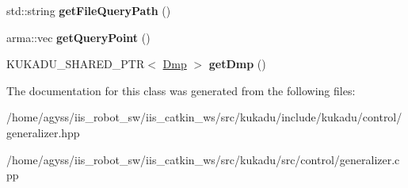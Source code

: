 \begin{DoxyCompactItemize}
\item 
std\+::string {\bfseries get\+File\+Query\+Path} ()\hypertarget{classkukadu_1_1QueryPoint_a89324d5514596508eb423e47fc7c5eb4}{}\label{classkukadu_1_1QueryPoint_a89324d5514596508eb423e47fc7c5eb4}

\item 
arma\+::vec {\bfseries get\+Query\+Point} ()\hypertarget{classkukadu_1_1QueryPoint_a532d7a36ed8e43f9a5cec52f05a0170a}{}\label{classkukadu_1_1QueryPoint_a532d7a36ed8e43f9a5cec52f05a0170a}

\item 
K\+U\+K\+A\+D\+U\+\_\+\+S\+H\+A\+R\+E\+D\+\_\+\+P\+TR$<$ \hyperlink{classkukadu_1_1Dmp}{Dmp} $>$ {\bfseries get\+Dmp} ()\hypertarget{classkukadu_1_1QueryPoint_a153252510a2083463caf5ce2cbcfeb5f}{}\label{classkukadu_1_1QueryPoint_a153252510a2083463caf5ce2cbcfeb5f}

\end{DoxyCompactItemize}


The documentation for this class was generated from the following files\+:\begin{DoxyCompactItemize}
\item 
/home/agyss/iis\+\_\+robot\+\_\+sw/iis\+\_\+catkin\+\_\+ws/src/kukadu/include/kukadu/control/generalizer.\+hpp\item 
/home/agyss/iis\+\_\+robot\+\_\+sw/iis\+\_\+catkin\+\_\+ws/src/kukadu/src/control/generalizer.\+cpp\end{DoxyCompactItemize}
